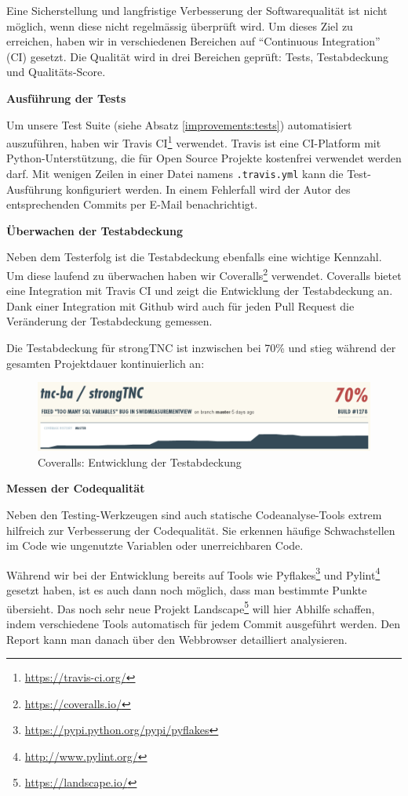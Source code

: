 Eine Sicherstellung und langfristige Verbesserung der Softwarequalität ist nicht
möglich, wenn diese nicht regelmässig überprüft wird. Um dieses Ziel zu
erreichen, haben wir in verschiedenen Bereichen auf \enquote{Continuous
Integration} (CI) gesetzt. Die Qualität wird in drei Bereichen geprüft: Tests,
Testabdeckung und Qualitäts-Score.

\textbf{Ausführung der Tests}

Um unsere Test Suite (siehe Absatz \ref{improvements:tests}) automatisiert
auszuführen, haben wir Travis
CI\footnote{\url{https://travis-ci.org/}} verwendet. Travis ist
eine CI-Platform mit Python-Unterstützung, die für Open Source Projekte
kostenfrei verwendet werden darf. Mit wenigen Zeilen in einer Datei namens
\texttt{.travis.yml} kann die Test-Ausführung konfiguriert werden. In einem
Fehlerfall wird der Autor des entsprechenden Commits per E-Mail benachrichtigt.

\textbf{Überwachen der Testabdeckung}

Neben dem Testerfolg ist die Testabdeckung ebenfalls eine wichtige Kennzahl. Um
diese laufend zu überwachen haben wir
Coveralls\footnote{\url{https://coveralls.io/}} verwendet. Coveralls bietet eine
Integration mit Travis CI und zeigt die Entwicklung der Testabdeckung an. Dank
einer Integration mit Github wird auch für jeden Pull Request die Veränderung
der Testabdeckung gemessen.

Die Testabdeckung für strongTNC ist inzwischen bei 70\% und stieg während der
gesamten Projektdauer kontinuierlich an:

\begin{figure}[H]
	\centering
	\includegraphics[width=\textwidth]{images/coveralls}
	\caption{Coveralls: Entwicklung der Testabdeckung}
	\label{improvements:coveralls}
\end{figure}

\textbf{Messen der Codequalität}

Neben den Testing-Werkzeugen sind auch statische Codeanalyse-Tools extrem
hilfreich zur Verbesserung der Codequalität. Sie erkennen häufige Schwachstellen
im Code wie ungenutzte Variablen oder unerreichbaren Code.

Während wir bei der Entwicklung bereits auf Tools wie
Pyflakes\footnote{\url{https://pypi.python.org/pypi/pyflakes}} und
Pylint\footnote{\url{http://www.pylint.org/}} gesetzt haben, ist es auch dann
noch möglich, dass man bestimmte Punkte übersieht. Das noch sehr neue Projekt
Landscape\footnote{\url{https://landscape.io/}} will hier Abhilfe schaffen,
indem verschiedene Tools automatisch für jedem Commit ausgeführt werden. Den
Report kann man danach über den Webbrowser detailliert analysieren.

